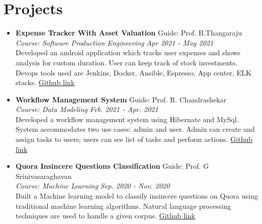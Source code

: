 \documentclass[letterpaper,11pt]{article}
\makeatletter
\newcommand{\resumeItem}[2]{
  \item\small{
    {#1}\hfill{#2}%
  }
}
\newcommand{\resumeSubheading}[4]{
\item\textbf{#1} \hfill #2\null\\
 \textit{\small#3} \hfill \textit{\small#4}%
}
\newcommand{\resumeSubItem}[2]{\resumeItem{#1}\hfill{#2}}
\newcommand{\resumeSubHeadingListStart}{\begin{itemize}[leftmargin=*]}
\newcommand{\resumeSubHeadingListEnd}{\end{itemize}}
\makeatother
\begin{document}
\section{Projects}
  \resumeSubHeadingListStart
    \resumeSubheading
    {Expense Tracker With Asset Valuation}{Guide: Prof. B.Thangaraju}
    {Course: Software Production Engineering}{Apr 2021 - May 2021}\\
    Developed an android application which tracks user expenses and shows analysis for custom duration. User can keep track of stock investments. Devops tools used are Jenkins, Docker, Ansible, Espresso, App center, ELK stacks. \href{https://github.com/printSamarth/ExpenseTracker}{Github link}
    \resumeSubheading
    {Workflow Management System}{Guide: Prof. R. Chandrashekar}
    {Course: Data Modeling}{Feb. 2021 - Apr. 2021}\\
    Developed a workflow management system using Hibernate and MySql. System accommodates two use cases: admin and user. Admin can create and assign tasks to users; users can see list of tasks and perform actions.  \href{https://github.com/shivam228/DM-project-with-front-end}{Github link} 
  \resumeSubheading
    {Quora Insincere Questions Classification}{Guide: Prof. G Srinivasaraghavan}
   {Course: Machine Learning}{Sep. 2020 - Nov. 2020}\\
    Built a Machine learning model to classify insincere questions on Quora using traditional machine learning algorithms. Natural language processing techniques are used to handle a given corpus. 
    \href{https://github.com/VaibhaviTikone/Quora-insincere-questions-classification}{Github link}
   \
  \resumeSubHeadingListEnd

%
\end{document}
